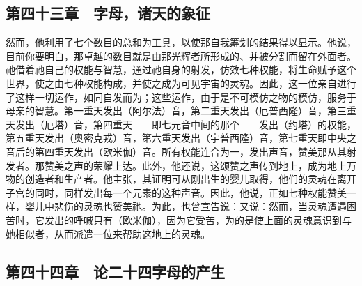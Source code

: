
\subsection{第四十三章　字母，诸天的象征}

然而，他利用了七个数目的总和为工具，以使那自我筹划的结果得以显示。他说，目前你要明白，那卓越的数目就是由那光辉者所形成的、并被分割而留在外面者。祂借着祂自己的权能与智慧，通过祂自身的射发，仿效七种权能，将生命赋予这个世界，使之由七种权能构成，并使之成为可见宇宙的灵魂。因此，这一位亲自进行了这样一切运作，如同自发而为；这些运作，由于是不可模仿之物的模仿，服务于母亲的智慧。第一重天发出（阿尔法）音，第二重天发出（厄普西隆）音，第三重天发出（厄塔）音，第四重天——即七元音中间的那个——发出（约塔）的权能，第五重天发出（奥密克戎）音，第六重天发出（宇普西隆）音，第七重天即中央之音后的第四重天发出（欧米伽）音。所有权能连合为一，发出声音，赞美那从其射发者。那赞美之声的荣耀上达。此外，他还说，这颂赞之声传到地上，成为地上万物的创造者和生产者。他主张，其证明可从刚出生的婴儿取得，他们的灵魂在离开子宫的同时，同样发出每一个元素的这种声音。因此，他说，正如七种权能赞美一样，婴儿中悲伤的灵魂也赞美祂。为此，也曾宣告说：又说：然而，当灵魂遭遇困苦时，它发出的呼喊只有（欧米伽），因为它受苦，为的是使上面的灵魂意识到与她相似者，从而派遣一位来帮助这地上的灵魂。\par


\subsection{第四十四章　论二十四字母的产生}

